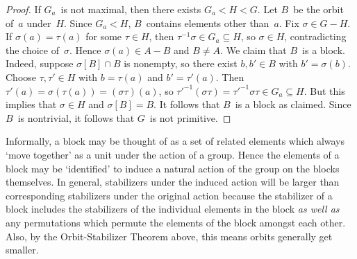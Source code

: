 \documentclass[letterpaper]{article}
\newcommand{\sect}{\cap}
\begin{document}
\begin{enumerate}[itemsep=0pt]
\begin{proof}
If $G_a$~is not maximal, then there exists $G_a<H<G$. Let $B$~be the orbit of~$a$ under~$H$. Since $G_a<H$, $B$~contains elements other than~$a$. Fix $\sigma\in G-H$. If $\sigma(a)=\tau(a)$ for some $\tau\in H$, then $\tau^{-1}\sigma\in G_a\subseteq H$, so $\sigma\in H$, contradicting the choice of~$\sigma$. Hence $\sigma(a)\in A-B$ and $B\ne A$. We claim that $B$~is a block. Indeed, suppose $\sigma[B]\sect B$ is nonempty, so there exist $b,b'\in B$ with $b'=\sigma(b)$. Choose $\tau,\tau'\in H$ with $b=\tau(a)$ and $b'=\tau'(a)$. Then $\tau'(a)=\sigma(\tau(a))=(\sigma\tau)(a)$, so $\tau'^{-1}(\sigma\tau)=\tau'^{-1}\sigma\tau\in G_a\subseteq H$. But this implies that $\sigma\in H$ and $\sigma[B]=B$. It follows that $B$~is a block as claimed. Since $B$~is nontrivial, it follows that $G$~is not primitive.
\end{proof}
\end{enumerate}
\noindent Informally, a block may be thought of as a set of related elements which always `move together' as a unit under the action of a group. Hence the elements of a block may be `identified' to induce a natural action of the group on the blocks themselves. In general, stabilizers under the induced action will be larger than corresponding stabilizers under the original action because the stabilizer of a block includes the stabilizers of the individual elements in the block \emph{as well as} any permutations which permute the elements of the block amongst each other. Also, by the Orbit-Stabilizer Theorem above, this means orbits generally get smaller.
\end{document}
